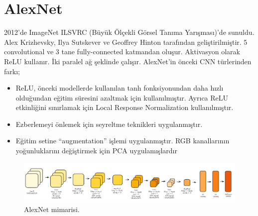 \section{AlexNet}
2012'de ImageNet ILSVRC (Büyük Ölçekli Görsel Tanıma Yarışması)'de sunuldu. Alex Krizhevsky, Ilya Sutskever ve Geoffrey Hinton tarafından geliştirilmiştir. 5 convolutional ve 3 tane fully-connected katmandan oluşur. Aktivasyon olarak ReLU kullanır. İki paralel ağ şeklinde çalışır. AlexNet'in önceki CNN türlerinden farkı;

\begin{itemize}
    \item ReLU, önceki modellerde kullanılan tanh fonksiyonundan daha hızlı olduğundan eğitim süresini azaltmak için kullanılmıştır. Ayrıca ReLU etkinliğini sınırlamak için Local Response Normalization kullanılmıştır.
    \item Ezberlemeyi önlemek için seyreltme teknikleri uygulanmıştır.
    \item Eğitim setine “augmentation” işlemi uygulanmıştır. RGB kanallarının yoğunluklarını değiştirmek için PCA uygulamışlardır
\end{itemize}

\begin{figure}[h]
    \centering
    \includegraphics[width=1\textwidth]{images/alexnet.png}
    \caption{AlexNet mimarisi.}
    \label{fig:enter-label}
\end{figure}

